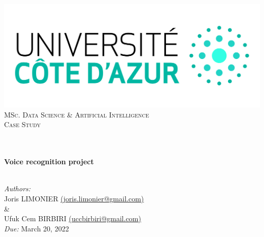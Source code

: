 \begin{titlepage}
	\begin{center}
		\includegraphics[width=\textwidth]{images/logo_uca.jpeg}\\[0.1cm]
		\vspace{1.5cm}
		\textsc{\Large MSc. Data Science \& Artificial Intelligence}\\[1.2cm]
		\textsc{\Large Case Study}\\[1.2cm]
		\\
		\vspace{1cm}

		\HRule \\[0.6cm]
		{\huge \bfseries Voice recognition project}\\[0.3cm]
		\HRule \\[1.3cm]
		\vfill

		\large
		\emph{Authors:} 
		\\[.2cm]
		Joris LIMONIER \href{mailto:joris.limonier@gmail.com}{\color{black}(joris.limonier@gmail.com)}
		\\[.2cm]
		\&
		\\[.2cm]
		Ufuk Cem BIRBIRI
		\href{mailto:uccbirbiri@gmail.com}{\color{black}(uccbirbiri@gmail.com)} \\[.5cm]
		\emph{Due:} {\large March 20, 2022}
	\end{center}
\end{titlepage}


